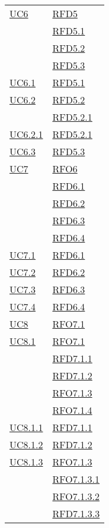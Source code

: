 \begin{longtable}{|>{\centering}m{5cm}|m{5cm}<{\centering}|}
\hyperref[UC6]{UC6} & \hyperlink{RFD5}{RFD5}\\
& \hyperlink{RFD5.1}{RFD5.1}\\
& \hyperlink{RFD5.2}{RFD5.2}\\
& \hyperlink{RFD5.3}{RFD5.3}\\ \hline
\hyperref[UC6.1]{UC6.1} & \hyperlink{RFD5.1}{RFD5.1}\\ \hline
\hyperref[UC6.2]{UC6.2} & \hyperlink{RFD5.2}{RFD5.2}\\
& \hyperlink{RFD5.2.1}{RFD5.2.1}\\ \hline
\hyperref[UC6.2.1]{UC6.2.1} & \hyperlink{RFD5.2.1}{RFD5.2.1}\\ \hline
\hyperref[UC6.3]{UC6.3} & \hyperlink{RFD5.3}{RFD5.3}\\ \hline
\hyperref[UC7]{UC7} & \hyperlink{RFO6}{RFO6}\\
& \hyperlink{RFD6.1}{RFD6.1}\\
& \hyperlink{RFD6.2}{RFD6.2}\\
& \hyperlink{RFD6.3}{RFD6.3}\\
& \hyperlink{RFD6.4}{RFD6.4}\\ \hline
\hyperref[UC7.1]{UC7.1} & \hyperlink{RFD6.1}{RFD6.1}\\ \hline
\hyperref[UC7.2]{UC7.2} & \hyperlink{RFD6.2}{RFD6.2}\\ \hline
\hyperref[UC7.3]{UC7.3} & \hyperlink{RFD6.3}{RFD6.3}\\ \hline
\hyperref[UC7.4]{UC7.4} & \hyperlink{RFD6.4}{RFD6.4}\\ \hline
\hyperref[UC8]{UC8} & \hyperlink{RFO7.1}{RFO7.1}\\ \hline
\hyperref[UC8.1]{UC8.1} & \hyperlink{RFO7.1}{RFO7.1}\\
& \hyperlink{RFD7.1.1}{RFD7.1.1}\\
& \hyperlink{RFD7.1.2}{RFD7.1.2}\\
& \hyperlink{RFO7.1.3}{RFO7.1.3}\\
& \hyperlink{RFO7.1.4}{RFO7.1.4}\\ \hline
\hyperref[UC8.1.1]{UC8.1.1} & \hyperlink{RFD7.1.1}{RFD7.1.1}\\ \hline
\hyperref[UC8.1.2]{UC8.1.2} & \hyperlink{RFD7.1.2}{RFD7.1.2}\\ \hline
\hyperref[UC8.1.3]{UC8.1.3} & \hyperlink{RFO7.1.3}{RFO7.1.3}\\
& \hyperlink{RFO7.1.3.1}{RFO7.1.3.1}\\
& \hyperlink{RFO7.1.3.2}{RFO7.1.3.2}\\
& \hyperlink{RFD7.1.3.3}{RFD7.1.3.3}\\

\end{longtable}
